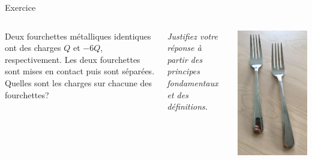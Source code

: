 \documentclass{beamer}
\begin{document}
\begin{frame}[t]{Exercice}
\begin{columns}
  Deux fourchettes métalliques identiques ont des charges $Q$ et $-6Q$,
  respectivement. Les deux fourchettes sont mises en contact puis sont
  séparées.  Quelles sont les charges sur chacune des fourchettes?

  \vspace{\baselineskip}
  \textit{Justifiez votre réponse à partir des principes fondamentaux et des
  définitions.}

  \begin{center}
    \includegraphics[width=\textwidth]{figures/fourchettes.jpg}
  \end{center}
\end{columns}
\end{frame}
\end{document}
